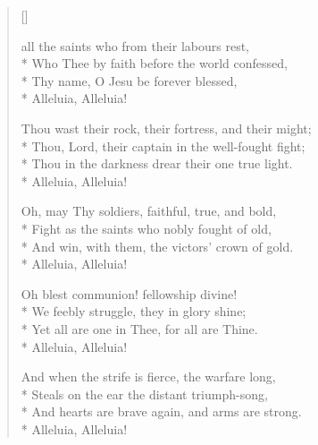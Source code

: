 \newHymn

\settowidth{\versewidth}{For all the saints who from their labours rest ahah}

\begin{verse}[\versewidth]

\begin{patverse}
{} all the saints who from their labours rest,\\*
        Who Thee by faith before the
world confessed,\\*
    Thy name, O Jesu be
    forever blessed,\\*
        Alleluia, Alleluia!
\end{patverse}

\begin{patverse}
Thou wast their rock, their fortress, and their might;\\*
        Thou, Lord, their captain in the well-fought fight;\\*
    Thou in the darkness drear their one true light.\\*
        Alleluia, Alleluia!
\end{patverse}

\begin{patverse}
Oh, may Thy soldiers,
    faithful,
    true,
    and bold,\\*
Fight as the saints who nobly fought of old,\\*
    And win, with them, the victors' crown of gold.\\*
        Alleluia, Alleluia!
\end{patverse}

\begin{patverse}
Oh blest communion! fellowship divine!\\*
        We feebly struggle, they in glory shine;\\*
    Yet all are one in Thee, for all are Thine.\\*
          Alleluia, Alleluia!
\end{patverse}

\begin{patverse}
And when the strife is fierce, the warfare long,\\*
        Steals on the ear the distant triumph-song,\\*
    And hearts are brave again, and
    arms are strong.\\*
        Alleluia, Alleluia!
\end{patverse}


\end{verse}
